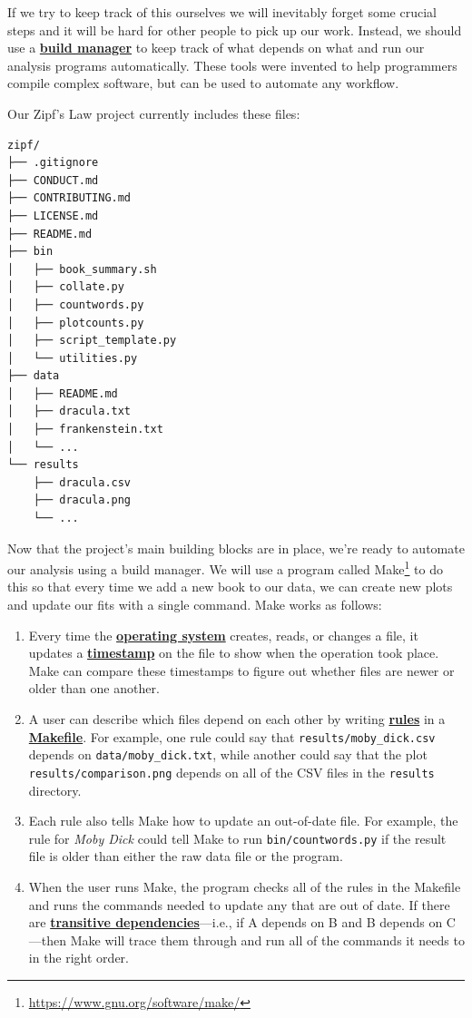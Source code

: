 \documentclass[
]{krantz}
\renewcommand{\href}[2]{#2\footnote{\url{#1}}}
\newcommand{\gref}[2]{\hyperlink{#2}{\textbf{#1}}}
\begin{document}
If we try to keep track of this ourselves
we will inevitably forget some crucial steps
and it will be hard for other people to pick up our work.
Instead,
we should use a \gref{build manager}{build\_manager}
to keep track of what depends on what
and run our analysis programs automatically.
These tools were invented to help programmers compile complex software,
but can be used to automate any workflow.

Our Zipf's Law project currently includes these files:

\begin{verbatim}
zipf/
├── .gitignore
├── CONDUCT.md
├── CONTRIBUTING.md
├── LICENSE.md
├── README.md
├── bin
│   ├── book_summary.sh
│   ├── collate.py
│   ├── countwords.py
│   ├── plotcounts.py
│   ├── script_template.py
│   └── utilities.py
├── data
│   ├── README.md
│   ├── dracula.txt
│   ├── frankenstein.txt
│   └── ...
└── results
    ├── dracula.csv
    ├── dracula.png
    └── ...
\end{verbatim}

Now that the project's main building blocks are in place,
we're ready to automate our analysis using a build manager.
We will use a program called \href{https://www.gnu.org/software/make/}{Make} to do this
so that every time we add a new book to our data,
we can create new plots and update our fits with a single command.
Make works as follows:

\begin{enumerate}
\def\labelenumi{\arabic{enumi}.}
\item
  Every time the \gref{operating system}{operating\_system} creates, reads, or changes a file,
  it updates a \gref{timestamp}{timestamp} on the file to show when the operation took place.
  Make can compare these timestamps
  to figure out whether files are newer or older than one another.
\item
  A user can describe which files depend on each other
  by writing \gref{rules}{build\_rule} in a \gref{Makefile}{makefile}.
  For example,
  one rule could say that \texttt{results/moby\_dick.csv} depends on \texttt{data/moby\_dick.txt},
  while another could say that the plot \texttt{results/comparison.png}
  depends on all of the CSV files in the \texttt{results} directory.
\item
  Each rule also tells Make how to update an out-of-date file.
  For example,
  the rule for \emph{Moby Dick} could tell Make to run \texttt{bin/countwords.py}
  if the result file is older than either the raw data file or the program.
\item
  When the user runs Make,
  the program checks all of the rules in the Makefile
  and runs the commands needed to update any that are out of date.
  If there are \gref{transitive dependencies}{transitive\_dependency}---i.e.,
  if A depends on B and B depends on C---then Make will trace them through
  and run all of the commands it needs to in the right order.
\end{enumerate}
\end{document}
